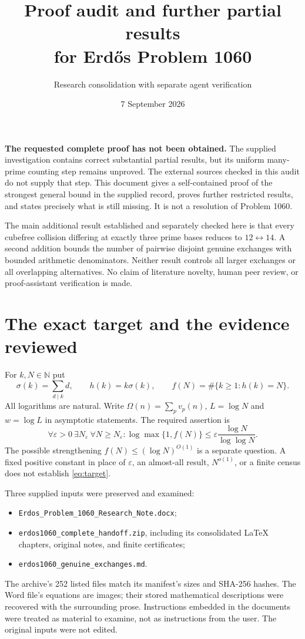 \documentclass[11pt,a4paper]{article}
\title{Proof audit and further partial results\\for Erd\H{o}s Problem 1060}
\author{Research consolidation with separate agent verification}
\date{7 September 2026}
\theoremstyle{remark}
\newcommand{\NN}{\mathbb N}
\begin{document}
\maketitle

\textbf{The requested complete proof has not been obtained.} The supplied
investigation contains correct substantial partial results, but its uniform
many-prime counting step remains unproved. The external sources checked in this
audit do not supply that step. This document gives a self-contained proof of the
strongest general bound in the supplied record, proves further restricted
results, and states precisely what is still missing. It is not a resolution of
Problem 1060.

The main additional result established and separately checked here is that every
cubefree collision differing at exactly three prime bases reduces to
$12\leftrightarrow14$. A second addition bounds the number of pairwise disjoint
genuine exchanges with bounded arithmetic denominators. Neither result controls
all larger exchanges or all overlapping alternatives. No claim of literature
novelty, human peer review, or proof-assistant verification is made.

\tableofcontents
\newpage

\section{The exact target and the evidence reviewed}
For $k,N\in\NN$ put
\[
 \sigma(k)=\sum_{d\mid k}d,\qquad h(k)=k\sigma(k),\qquad
 f(N)=\#\{k\ge1:h(k)=N\}.
\]
All logarithms are natural. Write $\Omega(n)=\sum_p v_p(n)$,
$L=\log N$ and $w=\log L$ in asymptotic statements. The required assertion is
\begin{equation}\label{eq:target}
 \forall\varepsilon>0\ \exists N_\varepsilon\ \forall N\ge N_\varepsilon:
 \log\max\{1,f(N)\}\le\varepsilon\frac{\log N}{\log\log N}.
\end{equation}
The possible strengthening $f(N)\le(\log N)^{O(1)}$ is a separate question.
A fixed positive constant in place of $\varepsilon$, an almost-all result,
$N^{o(1)}$, or a finite census does not establish \eqref{eq:target}.

Three supplied inputs were preserved and examined:
\begin{itemize}
\item \texttt{Erdos\_Problem\_1060\_Research\_Note.docx};
\item \texttt{erdos1060\_complete\_handoff.zip}, including its consolidated
      LaTeX chapters, original notes, and finite certificates;
\item \texttt{erdos1060\_genuine\_exchanges.md}.
\end{itemize}
The archive's 252 listed files match its manifest's sizes and SHA-256 hashes.
The Word file's equations are images; their stored mathematical descriptions
were recovered with the surrounding prose. Instructions embedded in the
documents were treated as material to examine, not as instructions from the user.
The original inputs were not edited.
\end{document}
